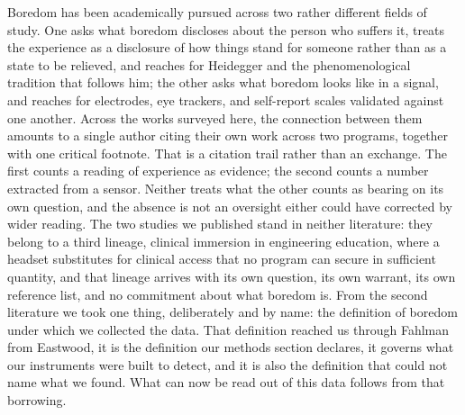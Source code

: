 
Boredom has been academically pursued across two rather different fields of study. One asks
what boredom discloses about the person who suffers it, treats the experience as a disclosure
of how things stand for someone rather than as a state to be relieved, and reaches for
Heidegger and the phenomenological tradition that follows him; the other asks what boredom
looks like in a signal, and reaches for electrodes, eye trackers, and self-report scales
validated against one another. Across the works surveyed here, the connection between them
amounts to a single author citing their own work across two programs, together with one
critical footnote. That is a citation trail rather than an exchange. The first counts a
reading of experience as evidence; the second counts a number extracted from a sensor.
Neither treats what the other counts as bearing on its own question, and the absence is not an
oversight either could have corrected by wider reading. The two studies we published stand in
neither literature: they belong to a third lineage, clinical immersion in engineering
education, where a headset substitutes for clinical access that no program can secure in
sufficient quantity, and that lineage arrives with its own question, its own warrant, its own
reference list, and no commitment about what boredom is. From the second literature we took
one thing, deliberately and by name: the definition of boredom under which we collected the
data. That definition reached us through Fahlman from Eastwood, it is the definition our
methods section declares, it governs what our instruments were built to detect, and it is also
the definition that could not name what we found. What can now be read out of this data
follows from that borrowing.
